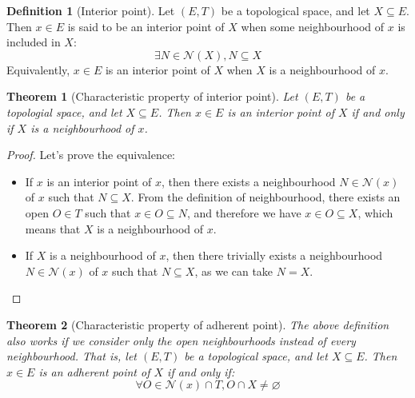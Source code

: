 \documentclass{article}
\newtheorem{theorem}{Theorem}[section]
\theoremstyle{definition}
\newtheorem{definition}{Definition}[section]
\theoremstyle{remark}
\theoremstyle{example}
\theoremstyle{notation}
\begin{document}
\begin{definition}[Interior point]
		Let $(E, T)$ be a topological space, and let $X \subseteq E$. Then $x \in E$ is said to be an interior point of $X$ when some neighbourhood of $x$ is included in $X$:
				$$\exists N \in \mathcal{N}(X), N \subseteq X$$
		Equivalently, $x \in E$ is an interior point of $X$ when $X$ is a neighbourhood of $x$.
\end{definition}

\begin{theorem}[Characteristic property of interior point]
		Let $(E, T)$ be a topologial space, and let $X \subseteq E$. Then $x \in E$ is an interior point of $X$ if and only if $X$ is a neighbourhood of $x$.
\end{theorem}

\begin{proof}
		Let's prove the equivalence:
		\begin{itemize}
				\item If $x$ is an interior point of $x$, then there exists a neighbourhood $N \in \mathcal{N}(x)$ of $x$ such that $N \subseteq X$. From the definition of neighbourhood, there exists an open $O \in T$ such that $x \in O \subseteq N$, and therefore we have $x \in O \subseteq X$, which means that $X$ is a neighbourhood of $x$.
				\item If $X$ is a neighbourhood of $x$, then there trivially exists a neighbourhood $N \in \mathcal{N}(x)$ of $x$ such that $N \subseteq X$, as we can take $N = X$.
		\end{itemize}
\end{proof}

\begin{theorem}[Characteristic property of adherent point] \label{thm:adherent-carac}
		The above definition also works if we consider only the open neighbourhoods instead of every neighbourhood. That is, let $(E, T)$ be a topological space, and let $X \subseteq E$. Then $x \in E$ is an adherent point of $X$ if and only if:
				$$\forall O \in \mathcal{N}(x) \cap T, O \cap X \neq \varnothing$$
\end{theorem}
\end{document}
